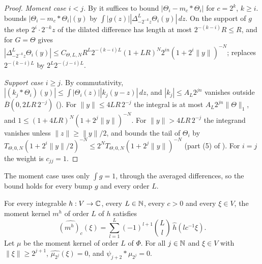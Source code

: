 \begin{proof}
\leanok
\emph{Moment case $i < j$.} By  it suffices to bound
$|\Theta_i - m_c * \Theta_i|$ for $c = 2^k$, $k \geq i$.  bounds
$|\Theta_i - m_c * \Theta_i|(y)$ by $\int |g(z)| |\Delta^L_{-2^{-k} z} \Theta_i(y)| \, dz$. On the
support of $g$ the step $2^i \cdot 2^{-k} z$ of the dilated difference has length at most
$2^{-(k-i)} R \leq R$, and  for $G = \Theta$ gives
$|\Delta^L_{-2^{-k} z} \Theta_i(y)| \leq C_{\Theta,L,N} R^L 2^{-(k-i)L} (1 + LR)^N 2^{in}
(1 + 2^i \|y\|)^{-N}$;  replaces $2^{-(k-i)L}$ by
$2^L 2^{-(j-i)L}$.

\emph{Support case $i \geq j$.} By commutativity,
$|(k_j * \Theta_i)(y)| \leq \int |\Theta_i(z)| |k_j(y - z)| \, dz$, and
$|k_j| \leq A_L 2^{jn}$ vanishes outside $\overline B(0, 2LR \, 2^{-j})$
(). For $\|y\| \leq 4LR \, 2^{-j}$ the integral is at most
$A_L 2^{jn} \|\Theta\|_1$, and $1 \leq (1 + 4LR)^N (1 + 2^j \|y\|)^{-N}$. For
$\|y\| > 4LR \, 2^{-j}$ the integrand vanishes unless $\|z\| \geq \|y\|/2$, and
 bounds the tail of $\Theta_i$ by
$T_{\Theta,0,N} (1 + 2^i \|y\|/2)^{-N} \leq 2^N T_{\Theta,0,N} (1 + 2^j \|y\|)^{-N}$ (part (5)
of ). For $i = j$ the weight is $c_{jj} = 1$.
\end{proof}

The moment case uses only $\int g = 1$, through the averaged differences, so the bound holds
for every bump $g$ and every order $L$.

\begin{lemma}
\label{lem:lp-moment-kernels}
\leanok
{}
For every integrable $h : V \to \mathbb{C}$, every $L \in \mathbb{N}$, every $c > 0$ and every $\xi \in V$, the
moment kernel $m^h$ of order $L$ of $h$ satisfies
\[
  \widehat{(m^h)_c}(\xi) = \sum_{l=1}^L (-1)^{l+1} \binom{L}{l} \, \widehat h(l c^{-1} \xi) .
\]
Let $\mu$ be the moment kernel of order $L$ of $\Phi$. For all $j \in \mathbb{N}$ and $\xi \in V$ with
$\|\xi\| \geq 2^{j+1}$, $\widehat{\mu_{2^j}}(\xi) = 0$, and $\psi_{j+2} * \mu_{2^j} = 0$.
\end{lemma}

